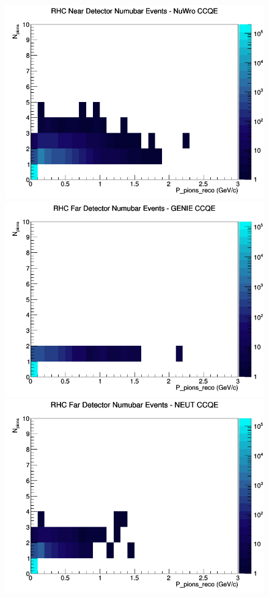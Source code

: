 \documentclass[12pt]{article}
\begin{document}
\begin{figure}[h]
\includegraphics[width=\linewidth]{eff_N_P/FGT/pions/CCQE_RHC_ND_numubar_N_P_NuWro.png}
\endminipage
\newline
{}
\includegraphics[width=\linewidth]{eff_N_P/FGT/pions/CCQE_RHC_FD_numubar_N_P_GENIE.png}
\endminipage
{}
\includegraphics[width=\linewidth]{eff_N_P/FGT/pions/CCQE_RHC_FD_numubar_N_P_NEUT.png}

\end{figure}
\end{document}
